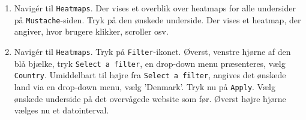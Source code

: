 \documentclass{article}
\begin{document}
\begin{enumerate}
\item Navigér til \texttt{Heatmaps}. Der vises et overblik over heatmaps for alle undersider på \texttt{Mustache}-siden. Tryk på den ønskede underside. Der vises et heatmap, der angiver, hvor brugere klikker, scroller osv.

\item Navigér til \texttt{Heatmaps}. Tryk på \texttt{Filter}-ikonet. Øverst, venstre hjørne af den blå bjælke, tryk \texttt{Select a filter}, en drop-down menu præsenteres, vælg \texttt{Country}. Umiddelbart til højre fra \texttt{Select a filter}, angives det ønskede land via en drop-down menu, vælg 'Denmark'. Tryk nu på \texttt{Apply}. Vælg ønskede underside på det overvågede website som før. Øverst højre hjørne vælges nu et datointerval. 

\end{enumerate}
\end{document}
